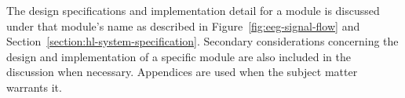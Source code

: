 The design specifications and implementation detail for a module is
discussed under that module's name as described in
Figure~\vref{fig:eeg-signal-flow} and
Section~\ref{section:hl-system-specification}. Secondary
considerations concerning the design and implementation of a specific
module are also included in the discussion when necessary. Appendices
are used when the subject matter warrants it.
























